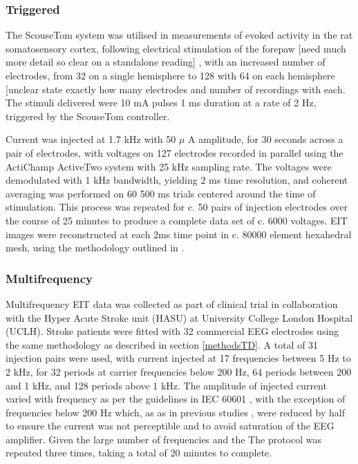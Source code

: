 \subsubsection{Triggered}

The ScouseTom system was utilised in measurements of evoked activity in the rat somatosensory cortex, following electrical stimulation of the forepaw [need much more detail so clear on a standalone reading] \cite{Aristovich_2016} \cite{Vongerichten_2016}, with an increased number of electrodes, from 32 on a single hemisphere to 128 with 64 on each hemisphere [unclear state exactly how many electrodes and number of recordings with each. The stimuli delivered were 10 mA pulses 1 ms duration at a rate of 2 Hz, triggered by the ScouseTom controller.

Current was injected at 1.7 kHz with 50 $\mu$ A amplitude, for 30 seconds across a pair of electrodes, with voltages on 127 electrodes recorded in parallel using the ActiChamp ActiveTwo system with 25 kHz sampling rate. The voltages were demodulated with 1 kHz bandwidth, yielding 2 ms time resolution, and coherent averaging was performed on 60 500 ms trials centered around the time of stimulation. This process was repeated for c. 50 pairs of injection electrodes over the course of 25 minutes to produce a complete data set of c. 6000 voltages. EIT images were reconstructed at each 2ms time point in c. 80000 element hexahedral mesh, using the methodology outlined in \cite{Aristovich_2014}.

\subsubsection{Multifrequency}

Multifrequency EIT data was collected as part of clinical trial in collaboration with the Hyper Acute Stroke unit (HASU) at University College London Hospital (UCLH). Stroke patients were fitted with 32 commercial EEG electrodes using the same methodology as described in section \ref{methodsTD}. A total of 31 injection pairs were used, with current injected at 17 frequencies between 5 Hz to 2 kHz, for 32 periods at carrier frequencies below 200 Hz, 64 periods between 200 and 1 kHz, and 128 periods above 1 kHz. The amplitude of injected current varied with frequency as per the guidelines in IEC 60601 \cite{IEC}, with the exception of frequencies below 200 Hz which, as as in previous studies \cite{McEwan_2006}, were reduced by half to ensure the current was not perceptible and to avoid saturation of the EEG amplifier. Given the large number of frequencies and the The protocol was repeated three times, taking a total of 20 minutes to complete. 

